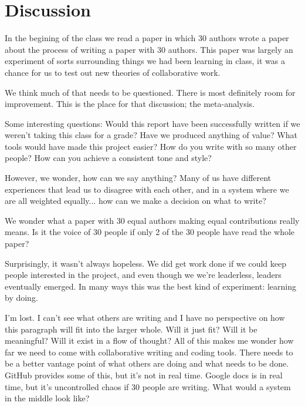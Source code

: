 \section{Discussion}

In the begining of the class we read a paper \cite{tomlinson2012} in which 30 authors wrote a paper about the process of writing a paper with 30 authors. This paper was largely an experiment of sorts surrounding things we had been learning in class, it was a chance for us to test out new theories of collaborative work.

We think much of that needs to be questioned. There is most definitely room for improvement. This is the place for that discussion; the meta-analysis.

Some interesting questions:
Would this report have been successfully written if we weren't taking this class for a grade?
Have we produced anything of value?
What tools would have made this project easier? 
How do you write with so many other people? 
How can you achieve a consistent tone and style? 

However, we wonder, how can we say anything? Many of us have different experiences that lead us to disagree with each other, and in a system where we are all weighted equally... how can we make a decision on what to write?

We wonder what a paper with 30 equal authors making equal contributions really means. Is it the voice of 30 people if only 2 of the 30 people have read the whole paper?

Surprisingly, it wasn't always hopeless. We did get work done if we could keep people interested in the project, and even though we we're leaderless, leaders eventually emerged. In many ways this was the best kind of experiment: learning by doing.  


I'm lost. I can't see what others are writing and I have no perspective on how this paragraph will fit into the larger whole. Will it just fit? Will it be meaningful? Will it exist in a flow of thought? All of this makes me wonder how far we need to come with collaborative writing and coding tools. There needs to be a better vantage point of what others are doing and what needs to be done. GitHub provides some of this, but it's not in real time. Google docs is in real time, but it's uncontrolled chaos if 30 people are writing. What would a system in the middle look like?

